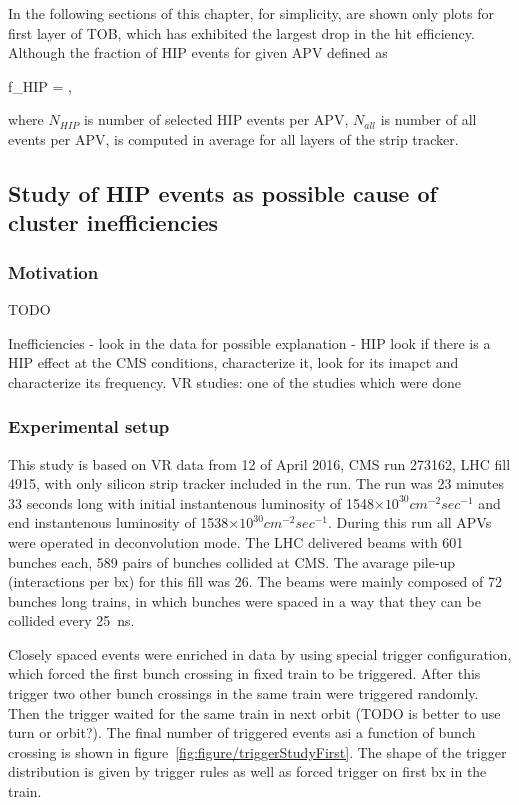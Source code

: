 In the following sections of this chapter, for simplicity, are shown only plots for first layer of TOB, which has exhibited the largest drop in the hit efficiency. Although the fraction of HIP events for given APV defined as


{
f_{HIP} = ,
}

where $N_{HIP}$ is number of selected HIP events per APV, $N_{all}$ is number of all events per APV, is computed in average for all layers of the strip tracker.


\subsection{Study of HIP events as possible cause of cluster inefficiencies~\label{sec:firstStudy}}

\subsubsection{Motivation}

TODO

Inefficiencies - look in the data for possible explanation - HIP
look if there is a HIP effect at the CMS conditions, characterize it, look for its imapct and characterize its frequency.
VR studies: one of the studies which were done

\subsubsection{Experimental setup} 

This study is based on VR data from 12 of April 2016, CMS run 273162, LHC fill 4915, with only silicon strip tracker included in the run. The run was 23 minutes 33 seconds long with initial instantenous luminosity of 1548$\times 10^{30} cm^{-2} sec^{-1}$ and end instantenous luminosity of 1538$\times 10^{30} cm^{-2} sec^{-1}$. During this run all APVs were operated in deconvolution mode. The LHC delivered beams with 601 bunches each, 589 pairs of bunches collided at CMS. The avarage pile-up (interactions per bx) for this fill was 26. The beams were mainly composed of 72 bunches long trains, in which bunches were spaced in a way that they can be collided every 25~ns.

Closely spaced events were enriched in data by using special trigger configuration, which forced the first bunch crossing in fixed train to be triggered. After this trigger two other bunch crossings in the same train were triggered randomly. Then the trigger waited for the same train in next orbit (TODO is better to use turn or orbit?). The final number of triggered events asi a function of bunch crossing is shown in figure~\ref{fig:figure/triggerStudyFirst}. The shape of the trigger distribution is given by trigger rules as well as forced trigger on first bx in the train.


